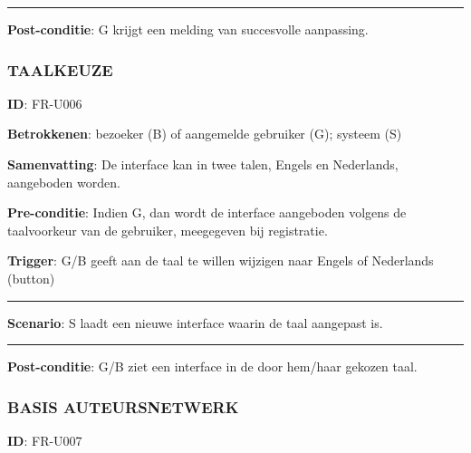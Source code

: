\vspace{2 mm}
\hrule
\vspace{4 mm}

\noindent \textbf{Post-conditie}: G krijgt een melding van succesvolle aanpassing. \\




\subsubsection{TAALKEUZE}
\vspace{2 mm}

\textbf{ID}: FR-U006
\vspace{2 mm}

\noindent \textbf{Betrokkenen}: bezoeker (B) of aangemelde gebruiker (G); systeem (S) 
\vspace{2 mm}

\noindent \textbf{Samenvatting}: De interface kan in twee talen, Engels en Nederlands, aangeboden worden. 
\vspace{2 mm}

\noindent \textbf{Pre-conditie}: Indien G, dan wordt de interface aangeboden volgens de taalvoorkeur van de gebruiker, meegegeven bij registratie.
\vspace{2 mm}

\noindent \textbf{Trigger}: G/B geeft aan de taal te willen wijzigen naar Engels of Nederlands (button)

\vspace{4 mm}
\hrule
\vspace{2 mm}
\noindent \textbf{Scenario}:
\noindent S laadt een nieuwe interface waarin de taal aangepast is.
\vspace{2 mm}
\hrule
\vspace{4 mm}

\noindent \textbf{Post-conditie}: G/B ziet een interface in de door hem/haar gekozen taal. \\





\subsubsection{BASIS AUTEURSNETWERK}
\vspace{2 mm}

\textbf{ID}: FR-U007
\vspace{2 mm}

